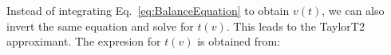 Instead of integrating Eq.~\eqref{eq:BalanceEquation} to obtain $v(t)$, 
we can also invert the same equation and solve for $t(v)$. This leads to the 
TaylorT2 approximant. The expresion for $t(v)$ is obtained from:
